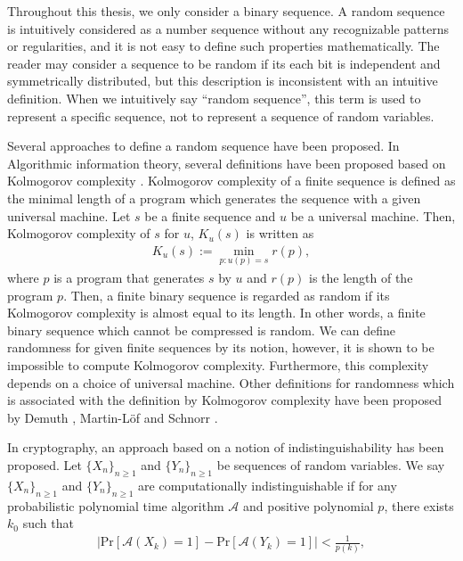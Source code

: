 Throughout this thesis, we only consider a binary sequence.
%
A random sequence is intuitively considered as a number sequence without any recognizable patterns or regularities, and it is not easy to define such properties mathematically.
The reader may consider a sequence to be random if its each bit is independent and symmetrically distributed, but this description is inconsistent with an intuitive definition. When we intuitively say ``random sequence'', this term is used to represent a specific sequence, not to represent a sequence of random variables.
\par
Several approaches to define a random sequence have been proposed.
In Algorithmic information theory, several definitions have been proposed based on Kolmogorov 
complexity \cite{kolmogorov1968three,chaitin1966length,chaitin1969length,chaitin1975theory}. 
Kolmogorov complexity of a finite sequence is defined as the minimal length of a program which generates the sequence with a given universal machine. Let $s$ be a finite sequence and $u$ be a universal machine. Then, Kolmogorov complexity of $s$ for $u$, $K_u(s)$ is written as 
\begin{align}
	K_u(s):= \min_{p:u(p)=s} r(p),	
\end{align}
where $p$ is a program that generates $s$ by $u$ and $r (p)$ is the length of the program $p$. 
%
Then, a finite binary sequence is regarded as random if its Kolmogorov complexity is almost equal to its length. In other words, a finite binary sequence which cannot be compressed is random. 
%
We can define randomness for given finite sequences by its notion, however, it is shown to be impossible to compute Kolmogorov complexity. Furthermore, this complexity depends on a choice of universal machine.
Other definitions for randomness which is associated with the definition by Kolmogorov complexity have been proposed by Demuth \cite{demuth1988remarks}, Martin-L\"{o}f \cite{martin1966definition,martin1971complexity} and Schnorr \cite{schnorr1971unified,schnorr1973process,schnorr1977general}.
\par
In cryptography, an approach based on a notion of indistinguishability has been proposed. 
Let $\{X_n\}_{n\geq 1}$ and $\{Y_n\}_{n\geq 1}$ be sequences of random variables. 
%
We say $\{X_n\}_{n\geq 1}$ and $\{Y_n\}_{n\geq 1}$ are computationally indistinguishable if for any probabilistic polynomial time algorithm $\mathcal{A}$ and positive polynomial $p$, there exists $k_0$ such that 
\begin{align}\label{eq:indistinguishable}
	\bigl| \mathrm{Pr}[\mathcal{A}(X_k) = 1] - \mathrm{Pr}[\mathcal{A}(Y_k) = 1] \bigr| < \frac{1}{p(k)},
\end{align}

